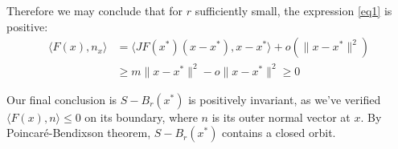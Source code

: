 \documentclass{article}
\begin{document}
Therefore we may conclude that for $r$ sufficiently small, the expression \ref{eq1} is positive:
\begin{align*}
	\langle F(x),n_x\rangle &=\langle JF(x^*)(x-x^*),x-x^*\rangle+o(\lVert x-x^*\rVert^2)\\
	&\geq m\lVert x-x^*\rVert^2 -o\lVert x-x^*\rVert^2 \geq 0
\end{align*}

Our final conclusion is $S-B_r(x^*)$ is positively invariant, as we've verified $\langle F(x),n\rangle\leq0$ on its boundary, where $n$ is its outer normal vector at $x$. By Poincar\'{e}-Bendixson theorem, $S-B_r(x^*)$ contains a closed orbit.
\end{document}
